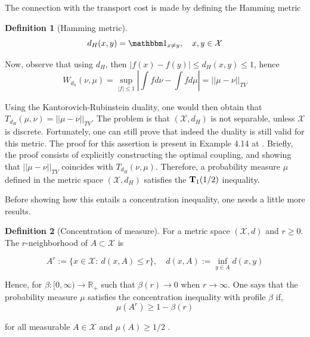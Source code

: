 \documentclass[10pt]{article}
\theoremstyle{definition}
\newtheorem{definition}{Definition}[section]
\begin{document}
The connection with the transport cost is made by defining the Hamming metric
\begin{definition}[Hamming metric]
$$d_H(x,y) = \mathbbm 1_{x \neq y}, \quad x,y \in \mathcal X$$
\end{definition}

Now, observe that using $d_H$, then $|f(x) - f(y)| \leq d_H(x,y) \leq 1$, hence
\begin{equation}
W_{d_h}(\nu, \mu) = \sup_{|f|\leq 1} \left |
\int f d\nu - \int f d\mu	
\right | = || \mu - \nu ||_{TV}
\end{equation}

Using the Kantorovich-Rubinstein duality, one would then obtain that
$T_{d_H}(\mu,\nu) =|| \mu - \nu ||_{TV} $. The problem is that $(\mathcal X, d_H)$
is not separable, unless $\mathcal X$ is discrete. Fortunately, one can still prove
that indeed the duality is still valid for this metric. The proof for this assertion
is present in Example 4.14 at \citet{van2014probability}. Briefly, the proof consists
of explicitly constructing the optimal coupling, and showing that $|| \mu - \nu ||_{TV}$
coincides with $T_{d_H}(\nu,\mu)$.
Therefore, a probability measure $\mu$ defined in the metric space $(\mathcal X, d_H)$
satisfies the $\textbf T_1(1/2)$ inequality.

Before showing how this entails a
concentration inequality, one needs a little more results.

\begin{definition}[Concentration of measure]
For a metric space $(\mathcal X, d)$ and $r \geq 0$. The $r$-neighborhood of
$A \subset \mathcal X$ is

$$
A^r := \{
x \in \mathcal X: \ d(x,A) \leq r
\},
\quad d(x,A) := \inf_{y \in A} d(x,y)
$$

Hence, for $\beta: [0,\infty) \rightarrow \mathbb R_+$ such that $\beta(r) \rightarrow 0$
when $r \rightarrow \infty$. One says that the probability measure $\mu$ satisfies the
concentration inequality with profile $\beta$ if,
$$
\mu(A^r) \geq 1 - \beta(r)
$$
\end{definition}
for all measurable $A \in \mathcal X$ and $\mu(A) \geq 1/2$ .

  
  
\end{document}
